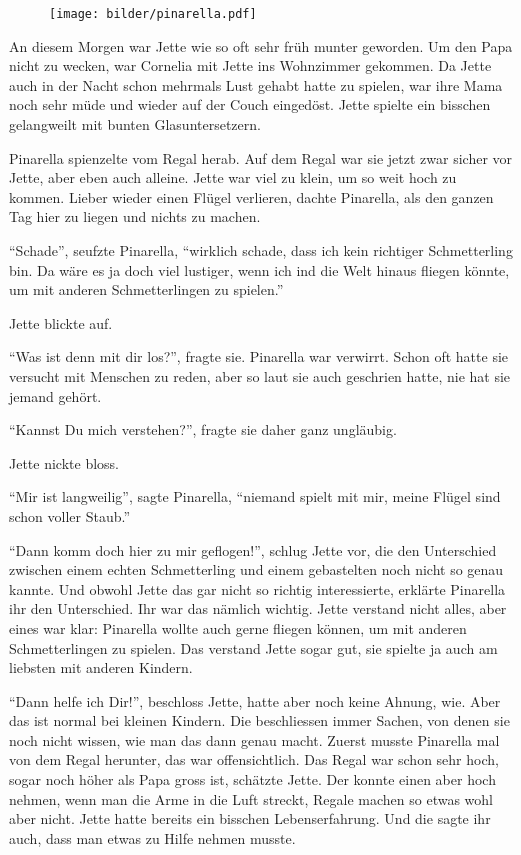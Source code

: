 \begin{figure}[ht]
\centering
\texttt{[image: bilder/pinarella.pdf]}
\end{figure}

An diesem Morgen war Jette wie so oft sehr früh munter geworden. Um den Papa nicht zu wecken, war Cornelia mit Jette ins Wohnzimmer gekommen. Da Jette auch in der Nacht schon mehrmals Lust gehabt hatte zu spielen, war ihre Mama noch sehr müde und wieder auf der Couch eingedöst. Jette spielte ein bisschen gelangweilt mit bunten Glasuntersetzern. 

Pinarella spienzelte vom Regal herab.  Auf dem Regal war sie jetzt zwar sicher vor Jette, aber eben auch alleine. Jette war viel zu klein, um so weit hoch zu kommen. Lieber wieder einen Flügel verlieren, dachte Pinarella, als den ganzen Tag hier zu liegen und nichts zu machen.

\enquote{Schade}, seufzte Pinarella, \enquote{wirklich schade, dass ich kein richtiger Schmetterling bin. Da wäre es ja doch viel lustiger, wenn ich ind die Welt hinaus fliegen könnte, um mit anderen Schmetterlingen zu spielen.} 

Jette blickte auf.

\enquote{Was ist denn mit dir los?}, fragte sie. Pinarella war verwirrt. Schon oft hatte sie versucht mit Menschen zu reden, aber so laut sie auch geschrien hatte, nie hat sie jemand gehört.

\enquote{Kannst Du mich verstehen?}, fragte sie daher ganz ungläubig. 

Jette nickte bloss. 

\enquote{Mir ist langweilig}, sagte Pinarella, \enquote{niemand spielt mit mir, meine Flügel sind schon voller Staub.}

\enquote{Dann komm doch hier zu mir geflogen!}, schlug Jette vor, die den Unterschied zwischen einem echten Schmetterling und einem gebastelten noch nicht so genau kannte. Und obwohl Jette das gar nicht so richtig interessierte, erklärte Pinarella ihr den Unterschied. Ihr war das nämlich wichtig. Jette verstand nicht alles, aber eines war klar: Pinarella wollte auch gerne fliegen können, um mit anderen Schmetterlingen zu spielen. Das verstand Jette sogar gut, sie spielte ja auch am liebsten mit anderen Kindern.

\enquote{Dann helfe ich Dir!}, beschloss Jette, hatte aber noch keine Ahnung, wie. Aber das ist normal bei kleinen Kindern. Die beschliessen immer Sachen, von denen sie noch nicht wissen, wie man das dann genau macht. Zuerst musste Pinarella mal von dem Regal herunter, das war offensichtlich. Das Regal war schon sehr hoch, sogar noch höher als Papa gross ist, schätzte Jette. Der konnte einen aber hoch nehmen, wenn man die Arme in die Luft streckt, Regale machen so etwas wohl aber nicht. Jette hatte bereits ein bisschen Lebenserfahrung. Und die sagte ihr auch, dass man etwas zu Hilfe nehmen musste.

